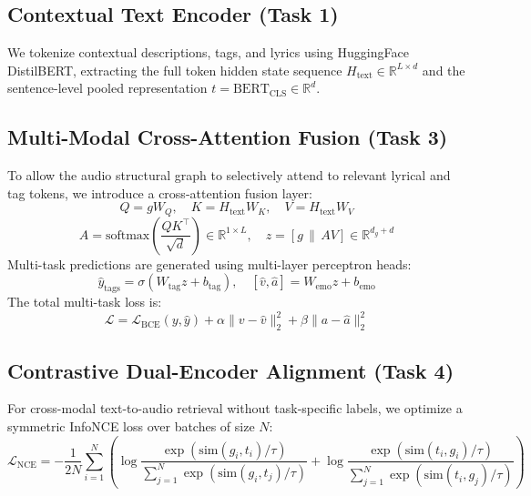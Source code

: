\documentclass{article}
\begin{document}
\subsection{Contextual Text Encoder (Task 1)}
We tokenize contextual descriptions, tags, and lyrics using HuggingFace DistilBERT, extracting the full token hidden state sequence $H_{\text{text}} \in \mathbb{R}^{L \times d}$ and the sentence-level pooled representation $t = \text{BERT}_{\text{CLS}} \in \mathbb{R}^d$.

\subsection{Multi-Modal Cross-Attention Fusion (Task 3)}
To allow the audio structural graph to selectively attend to relevant lyrical and tag tokens, we introduce a cross-attention fusion layer:
\begin{equation}
Q = g W_Q, \quad K = H_{\text{text}} W_K, \quad V = H_{\text{text}} W_V
\end{equation}
\begin{equation}
A = \text{softmax}\left(\frac{Q K^\top}{\sqrt{d}}\right) \in \mathbb{R}^{1 \times L}, \quad z = [g \,\|\, A V] \in \mathbb{R}^{d_g + d}
\end{equation}
Multi-task predictions are generated using multi-layer perceptron heads:
\begin{equation}
\hat{y}_{\text{tags}} = \sigma(W_{\text{tag}} z + b_{\text{tag}}), \quad [\hat{v}, \hat{a}] = W_{\text{emo}} z + b_{\text{emo}}
\end{equation}
The total multi-task loss is:
\begin{equation}
\mathcal{L} = \mathcal{L}_{\text{BCE}}(y, \hat{y}) + \alpha \|v - \hat{v}\|_2^2 + \beta \|a - \hat{a}\|_2^2
\end{equation}

\subsection{Contrastive Dual-Encoder Alignment (Task 4)}
For cross-modal text-to-audio retrieval without task-specific labels, we optimize a symmetric InfoNCE loss over batches of size $N$:
\begin{equation}
\mathcal{L}_{\text{NCE}} = -\frac{1}{2N} \sum_{i=1}^N \left( \log \frac{\exp(\text{sim}(g_i, t_i)/\tau)}{\sum_{j=1}^N \exp(\text{sim}(g_i, t_j)/\tau)} + \log \frac{\exp(\text{sim}(t_i, g_i)/\tau)}{\sum_{j=1}^N \exp(\text{sim}(t_i, g_j)/\tau)} \right)
\end{equation}
\end{document}
